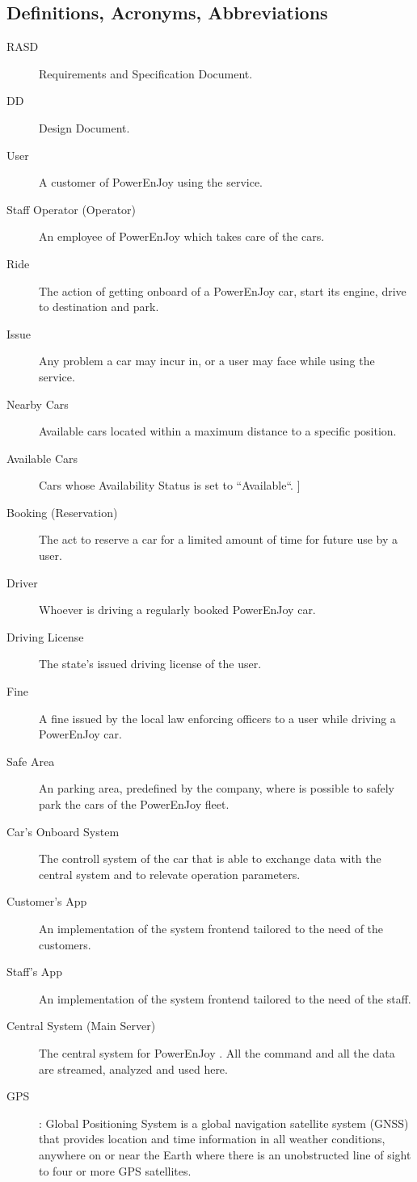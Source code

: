 \documentclass[11pt]{article} %
\newcommand{\pe}{PowerEnJoy }
\begin{document}
\subsection{Definitions, Acronyms, Abbreviations}
 \begin{description}
	\item[RASD] Requirements and Specification Document.
	\item[DD] Design Document.
	\item[User] A customer of \pe using the service.
	\item[Staff Operator (Operator)] An employee of \pe which takes care of the cars.
	\item[Ride] The action of getting onboard of a \pe car, start its engine, drive to destination and park.
	\item[Issue] Any problem a car may incur in, or a user may face while using the service.
	\item[Nearby Cars] Available cars located within a maximum distance to a specific position.
	\item[Available Cars] Cars whose Availability Status is set to ``Available``.
	]\item[Booking (Reservation)] The act to reserve a car for a limited amount of time for future use by a user.
	\item[Driver] Whoever is driving a regularly booked \pe car.
	\item[Driving License] The state's issued driving license of the user.
	\item[Fine] A fine issued by the local law enforcing officers to a user while driving a \pe car. 
	\item[Safe Area] An parking area, predefined by the company, where is possible to safely park the cars of the \pe fleet.
	\item[Car's Onboard System] The controll system of the car that is able to exchange data with the central system and to relevate operation parameters.
	\item[Customer's App] An implementation of the system frontend tailored to the need of the customers.
	\item[Staff's App] An implementation of the system frontend tailored to the need of the staff.
	\item[Central System (Main Server)] The central system for \pe. All the command and all the data are streamed, analyzed and used here.
	\item[GPS]: Global Positioning System is a global navigation satellite system (GNSS) that provides location and time information in all weather conditions, anywhere on or near the Earth where there is an unobstructed line of sight to four or more GPS satellites.

\end{description}
\end{document}
